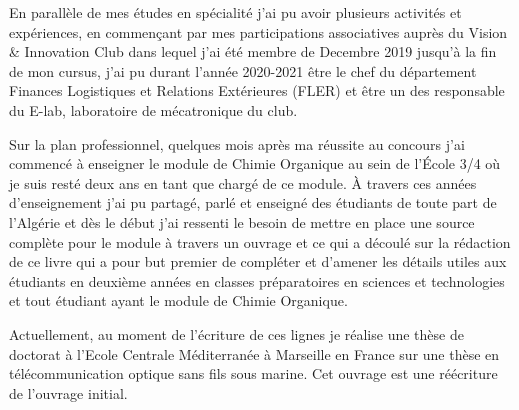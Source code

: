 \documentclass[a4paper, oneside]{book}
\begin{document}
En parallèle de mes études en spécialité j'ai pu avoir plusieurs activités et expériences, en commençant par mes participations associatives auprès du Vision \& Innovation Club dans lequel j'ai été membre de Decembre 2019 jusqu'à la fin de mon cursus, j'ai pu durant l'année 2020-2021 être le chef du département Finances Logistiques et Relations Extérieures (FLER) et être un des responsable du E-lab, laboratoire de mécatronique du club. 

Sur la plan professionnel, quelques mois après ma réussite au concours j'ai commencé à enseigner le module de Chimie Organique au sein de l'\'Ecole 3/4 où je suis resté deux ans en tant que chargé de ce module. À travers ces années d'enseignement j'ai pu partagé, parlé et enseigné des étudiants de toute part de l'Algérie et dès le début j'ai ressenti le besoin de mettre en place une source complète pour le module à travers un ouvrage et ce qui a découlé sur la rédaction de ce livre qui a pour but premier de compléter et d'amener les détails utiles aux étudiants en deuxième années en classes préparatoires en sciences et technologies et tout étudiant ayant le module de Chimie Organique.

Actuellement, au moment de l'écriture de ces lignes je réalise une thèse de doctorat à l'Ecole Centrale Méditerranée à Marseille en France sur une thèse en télécommunication optique sans fils sous marine. Cet ouvrage est une réécriture de l'ouvrage initial. 

\vspace*{\fill}
\mainmatter
\large  
\renewcommand{\contentsname}{Sommaire}
\renewcommand\listfigurename{Liste des figures}
\renewcommand\listtablename{Liste des tableaux}
\setcounter{tocdepth}{3}
\dominitoc
{}
\tableofcontents
\listoffigures
\listoftables
\end{document}
